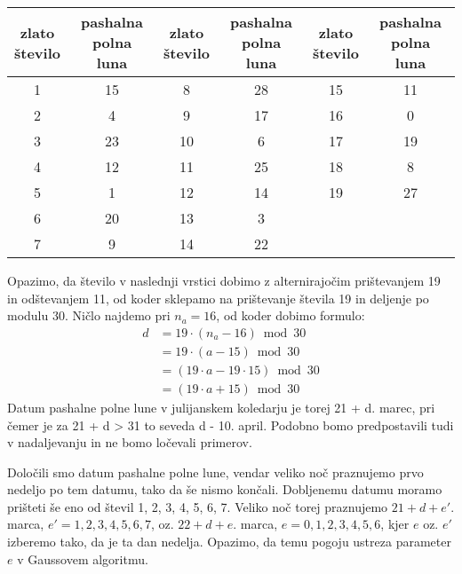 \documentclass[a4paper,12pt]{article}
\begin{document}
\begin{center}
    \begin{tabular}{| c c | c c | c c |}
        \hline
        \makecell{zlato \\ število} & \makecell{pashalna \\ polna luna} & \makecell{zlato \\ število} & \makecell{pashalna \\ polna luna} & \makecell{zlato \\ število} & \makecell{pashalna \\ polna luna} \\ \hline
        1 & 15 & 8 & 28 & 15 & 11 \\  
        2 & 4 & 9 & 17 & 16 & 0 \\
        3 & 23 & 10 & 6 & 17 & 19 \\
        4 & 12 & 11 & 25 & 18 & 8 \\
        5 & 1 & 12 & 14 & 19 & 27 \\
        6 & 20 & 13 & 3 & & \\
        7 & 9 & 14 & 22 & & \\ \hline
    \end{tabular}
\end{center}

Opazimo, da število v naslednji vrstici dobimo z alternirajočim prištevanjem 
19 in odštevanjem 11, od koder sklepamo na prištevanje števila 19 in deljenje 
po modulu 30. Ničlo najdemo pri $n_a = 16$, od koder dobimo formulo:
\begin{align*}
    d &= 19 \cdot (n_a - 16) \bmod 30 \\
    &= 19 \cdot (a - 15) \bmod 30 \\
    &= (19 \cdot a - 19 \cdot 15) \bmod 30 \\
    &= (19 \cdot a + 15) \bmod 30
\end{align*}
Datum pashalne polne lune v julijanskem koledarju je torej 21 + d. marec, pri 
čemer je za 21 + d > 31 to seveda d - 10. april. Podobno bomo predpostavili 
tudi v nadaljevanju in ne bomo ločevali primerov.

Določili smo datum pashalne polne lune, vendar veliko noč praznujemo prvo 
nedeljo po tem datumu, tako da še nismo končali. Dobljenemu datumu moramo 
prišteti še eno od števil 1, 2, 3, 4, 5, 6, 7. Veliko noč torej praznujemo 
$21 + d + e'$. marca, $e' = 1, 2, 3, 4, 5, 6, 7$, oz. $22 + d + e$. marca, 
$e = 0, 1, 2, 3, 4, 5, 6$, kjer $e$ oz. $e'$ izberemo tako, da je ta dan 
nedelja. Opazimo, da temu pogoju ustreza parameter $e$ v Gaussovem algoritmu.
\end{document}
